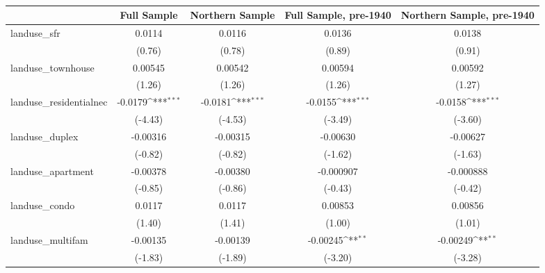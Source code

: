 \begin{table}[htbp]\centering
\def\sym#1{\ifmmode^{#1}\else\(^{#1}\)\fi}
\caption{ \label{tab1}}
\begin{tabular}{l*{4}{c}}
\toprule
                    &\multicolumn{1}{c}{Full Sample}&\multicolumn{1}{c}{Northern Sample}&\multicolumn{1}{c}{Full Sample, pre-1940}&\multicolumn{1}{c}{Northern Sample, pre-1940}\\
\midrule
landuse\_sfr         &      0.0114         &      0.0116         &      0.0136         &      0.0138         \\
                    &      (0.76)         &      (0.78)         &      (0.89)         &      (0.91)         \\
\addlinespace
landuse\_townhouse   &     0.00545         &     0.00542         &     0.00594         &     0.00592         \\
                    &      (1.26)         &      (1.26)         &      (1.26)         &      (1.27)         \\
\addlinespace
landuse\_residentialnec&     -0.0179\sym{***}&     -0.0181\sym{***}&     -0.0155\sym{***}&     -0.0158\sym{***}\\
                    &     (-4.43)         &     (-4.53)         &     (-3.49)         &     (-3.60)         \\
\addlinespace
landuse\_duplex      &    -0.00316         &    -0.00315         &    -0.00630         &    -0.00627         \\
                    &     (-0.82)         &     (-0.82)         &     (-1.62)         &     (-1.63)         \\
\addlinespace
landuse\_apartment   &    -0.00378         &    -0.00380         &   -0.000907         &   -0.000888         \\
                    &     (-0.85)         &     (-0.86)         &     (-0.43)         &     (-0.42)         \\
\addlinespace
landuse\_condo       &      0.0117         &      0.0117         &     0.00853         &     0.00856         \\
                    &      (1.40)         &      (1.41)         &      (1.00)         &      (1.01)         \\
\addlinespace
landuse\_multifam    &    -0.00135         &    -0.00139         &    -0.00245\sym{**} &    -0.00249\sym{**} \\
                    &     (-1.83)         &     (-1.89)         &     (-3.20)         &     (-3.28)         \\

\end{tabular}
\end{table}
